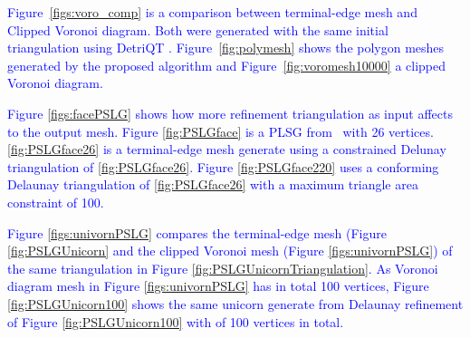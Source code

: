 \documentclass[pdflatex,sn-mathphys]{sn-jnl}%
\theoremstyle{thmstyleone}%
\theoremstyle{thmstyletwo}%
\theoremstyle{thmstylethree}%
\begin{document}
\textcolor{blue}{Figure~\ref{figs:voro_comp} is a comparison between terminal-edge mesh and Clipped Voronoi diagram. Both were generated with the same initial triangulation using DetriQT \cite{Detri2}. Figure~\ref{fig:polymesh} shows the polygon meshes generated by the proposed algorithm and Figure~\ref{fig:voromesh10000} a clipped Voronoi diagram. }

\textcolor{blue}{Figure \ref{figs:facePSLG} shows how more refinement triangulation as input affects to the output mesh. Figure \ref{fig:PSLGface} is a PLSG from~\cite{Shewchuktriangle} with 26 vertices. \ref{fig:PSLGface26} is a terminal-edge mesh generate using a constrained Delunay triangulation of \ref{fig:PSLGface26}. Figure \ref{fig:PSLGface220} uses a conforming Delaunay triangulation of  \ref{fig:PSLGface26} with a  maximum triangle area constraint of 100.}

\textcolor{blue}{Figure \ref{figs:univornPSLG} compares the terminal-edge mesh (Figure \ref{fig:PSLGUnicorn} and the clipped Voronoi mesh (Figure \ref{figs:univornPSLG}) of the same triangulation in Figure \ref{fig:PSLGUnicornTriangulation}. As Voronoi diagram mesh in Figure \ref{figs:univornPSLG} has in total 100  vertices, Figure \ref{fig:PSLGUnicorn100} shows the same unicorn generate from Delaunay refinement of Figure \ref{fig:PSLGUnicorn100} with of 100 vertices in total.}



\end{document}
